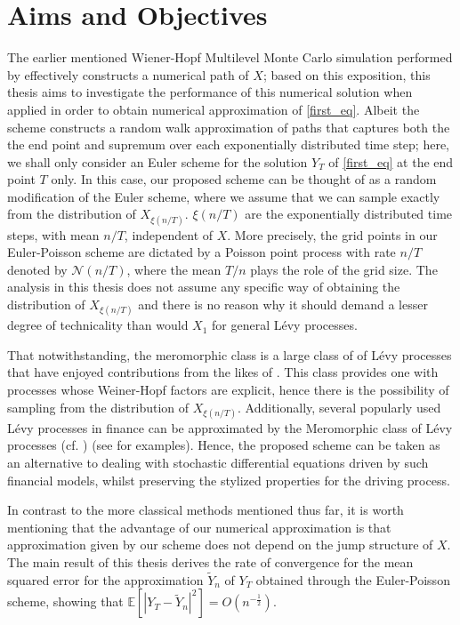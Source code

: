 \section{Aims and Objectives}
The earlier mentioned Wiener-Hopf Multilevel Monte Carlo simulation performed by  effectively constructs a numerical path of $X$; based on this exposition, this thesis aims to investigate the performance of this numerical solution when applied in order to obtain numerical approximation of \eqref{first_eq}. Albeit the scheme constructs a random walk approximation of paths that captures both the the end point and supremum over each exponentially distributed time step; here, we shall only consider an Euler scheme for the solution $Y_T$ of \eqref{first_eq} at the end point $T$ only. In this case, our proposed scheme can be thought of as a random modification of the Euler scheme, where we assume that we can sample exactly from the distribution of  $X_{\xi(n/T)}$. $\xi(n/T)$ are the exponentially distributed time steps, with mean $n/T$, independent of $X$. More precisely, the grid points in our Euler-Poisson scheme are dictated by a Poisson point process with rate $n/T$ denoted by $\mathcal{N}(n/T)$, where the mean $T/n$ plays the role of the grid size. The analysis in this thesis does not assume any specific way of obtaining the distribution of $X_{\xi(n/T)}$ and there is no reason why it should demand a lesser degree of technicality than would $X_1$ for general L\'evy processes.

That notwithstanding, the meromorphic class is a large class of of L\'evy processes that have enjoyed contributions from the likes of . This class provides one with processes whose Weiner-Hopf factors are explicit, hence there is the possibility of sampling from the distribution of $X_{\xi(n/T)}$. Additionally, several popularly used L\'evy processes in finance can be approximated by the Meromorphic class of L\'evy processes (cf. ) (see  for examples). Hence, the proposed scheme can be taken as an alternative to dealing with stochastic differential equations driven by such financial models, whilst preserving the stylized properties for the driving process.

In contrast to the more classical methods mentioned thus far, it is worth mentioning that the advantage of our numerical approximation is that approximation given by our scheme does not depend on the jump structure of $X$. The main result of this thesis derives the rate of convergence for the mean squared error for the approximation $\tilde{Y}_n$ of $Y_T$ obtained through the Euler-Poisson scheme, showing that $\mathbb{E}[|Y_T - \tilde{Y}_n|^2]= O(n^{-\frac{1}{2}})$.

